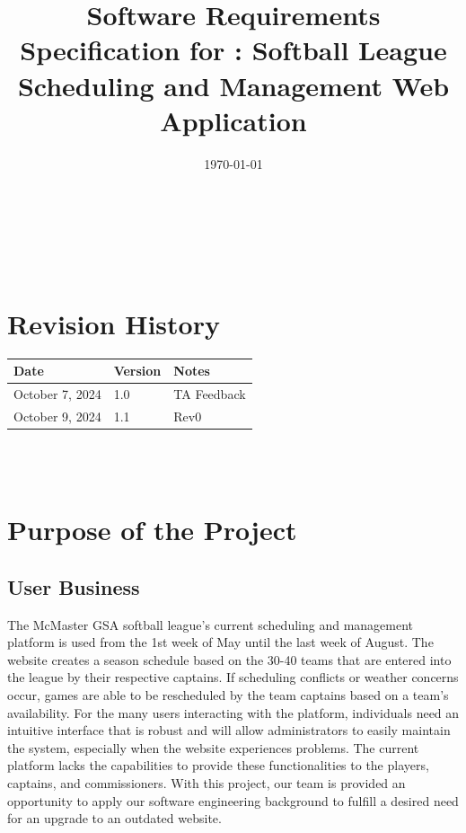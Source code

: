 \documentclass[12pt]{article}
\begin{document}
\title{Software Requirements Specification for \progname: Softball League Scheduling and Management Web Application} 
\author{\authname}
\date{\today}
	
\maketitle

~\newpage


\tableofcontents

~\newpage

\section*{Revision History}

\begin{tabularx}{\textwidth}{p{3cm}p{2cm}X}
\toprule {\textbf{Date}} & {\textbf{Version}} & {\textbf{Notes}}\\
\midrule
October 7, 2024 & 1.0 & TA Feedback\\
October 9, 2024 & 1.1 & Rev0\\
\bottomrule
\end{tabularx}

~\\

~\newpage
\section{Purpose of the Project}

\subsection{User Business}

The McMaster GSA softball league's current scheduling and management platform
is used from the 1st week of May until the last week of August. The website
creates a season schedule based on the 30-40 teams that are entered into the
league by their respective captains. If scheduling conflicts or weather concerns
occur, games are able to be rescheduled by the team captains based on a team's
availability. For the many users interacting with the platform, individuals need
an intuitive interface that is robust and will allow administrators to easily
maintain the system, especially when the website experiences problems. The current
platform lacks the capabilities to provide these functionalities to the players,
captains, and commissioners. With this project, our team is provided an
opportunity to apply our software engineering background to fulfill a
desired need for an upgrade to an outdated website.
\end{document}
